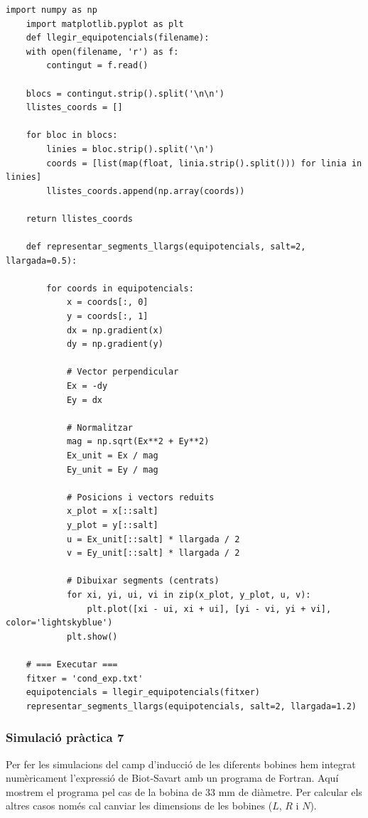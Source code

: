 \documentclass[11pt]{article}
\numberwithin{equation}{section}
\numberwithin{figure}{section}
\numberwithin{table}{section}
\begin{document}
\begin{lstlisting}[caption={Camp elèctric experimental}, label={lst:exp_camp}]
    import numpy as np
    import matplotlib.pyplot as plt
    def llegir_equipotencials(filename):
    with open(filename, 'r') as f:
        contingut = f.read()

    blocs = contingut.strip().split('\n\n')
    llistes_coords = []

    for bloc in blocs:
        linies = bloc.strip().split('\n')
        coords = [list(map(float, linia.strip().split())) for linia in linies]
        llistes_coords.append(np.array(coords))

    return llistes_coords

    def representar_segments_llargs(equipotencials, salt=2, llargada=0.5):
        
        for coords in equipotencials:
            x = coords[:, 0]
            y = coords[:, 1]
            dx = np.gradient(x)
            dy = np.gradient(y)

            # Vector perpendicular
            Ex = -dy
            Ey = dx

            # Normalitzar
            mag = np.sqrt(Ex**2 + Ey**2)
            Ex_unit = Ex / mag
            Ey_unit = Ey / mag

            # Posicions i vectors reduits
            x_plot = x[::salt]
            y_plot = y[::salt]
            u = Ex_unit[::salt] * llargada / 2
            v = Ey_unit[::salt] * llargada / 2

            # Dibuixar segments (centrats)
            for xi, yi, ui, vi in zip(x_plot, y_plot, u, v):
                plt.plot([xi - ui, xi + ui], [yi - vi, yi + vi], color='lightskyblue')    
            plt.show()

    # === Executar ===
    fitxer = 'cond_exp.txt'
    equipotencials = llegir_equipotencials(fitxer)
    representar_segments_llargs(equipotencials, salt=2, llargada=1.2)
\end{lstlisting}

\subsubsection{Simulació pràctica 7}\label{sec: fortran}
Per fer les simulacions del camp d'inducció de les diferents bobines hem integrat numèricament l'expressió de Biot-Savart amb un programa de Fortran. Aquí mostrem el programa pel cas de la bobina de 33 mm de diàmetre. Per calcular els altres casos només cal canviar les dimensions de les bobines ($L$, $R$ i $N$).
\end{document}
